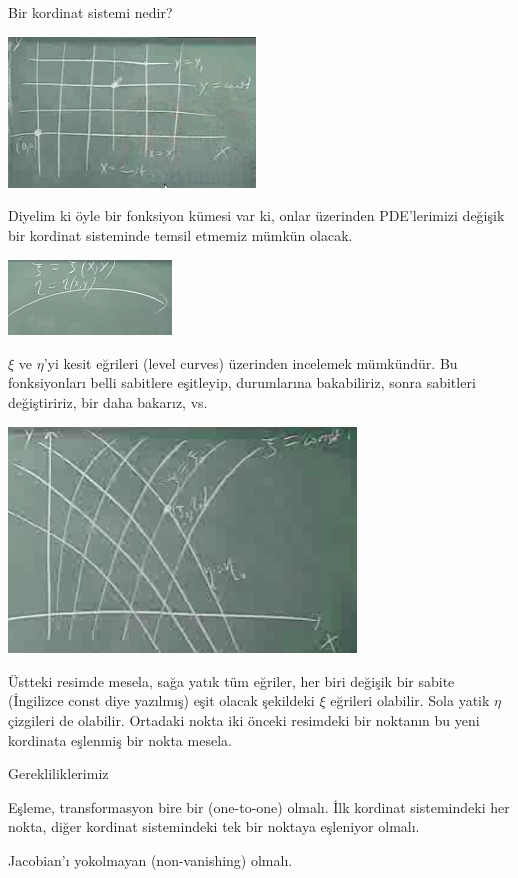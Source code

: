 \documentclass[12pt,fleqn]{article}\usepackage{../../common}
\begin{document}
Bir kordinat sistemi nedir? 

\includegraphics[height=4cm]{1_12.png}

Diyelim ki öyle bir fonksiyon kümesi var ki, onlar üzerinden PDE'lerimizi
değişik bir kordinat sisteminde temsil etmemiz mümkün olacak. 

\includegraphics[height=2cm]{1_13.png}

$\xi$ ve $\eta$'yi kesit eğrileri (level curves) üzerinden incelemek
mümkündür. Bu fonksiyonları belli sabitlere eşitleyip, durumlarına
bakabiliriz, sonra sabitleri değiştiririz, bir daha bakarız, vs. 

\includegraphics[height=6cm]{1_14.png}

Üstteki resimde mesela, sağa yatık tüm eğriler, her biri değişik bir sabite
(İngilizce const diye yazılmış) eşit olacak şekildeki $\xi$ eğrileri
olabilir. Sola yatik $\eta$ çizgileri de olabilir. Ortadaki nokta iki
önceki resimdeki bir noktanın bu yeni kordinata eşlenmiş bir nokta mesela.

Gerekliliklerimiz

Eşleme, transformasyon bire bir (one-to-one) olmalı. İlk kordinat
sistemindeki her nokta, diğer kordinat sistemindeki tek bir noktaya
eşleniyor olmalı. 

Jacobian'ı yokolmayan (non-vanishing) olmalı. 
\end{document}
